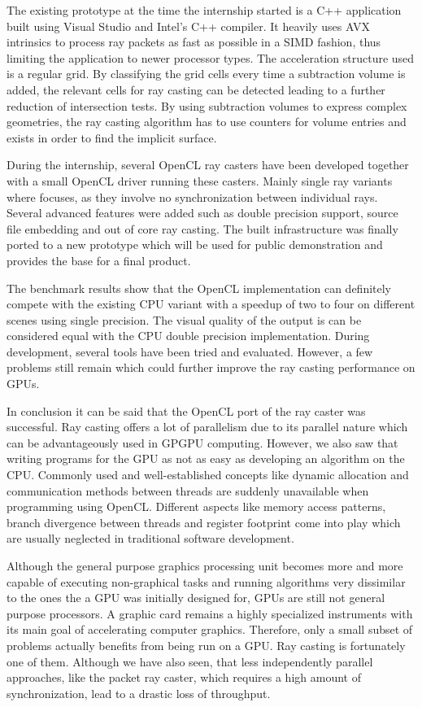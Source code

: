 The existing prototype at the time the internship started is a C++ application built using Visual Studio and Intel's C++ compiler. It heavily uses AVX intrinsics to process ray packets as fast as possible in a SIMD fashion, thus limiting the application to newer processor types. The acceleration structure used is a regular grid. By classifying the grid cells every time a subtraction volume is added, the relevant cells for ray casting can be detected leading to a further reduction of intersection tests. By using subtraction volumes to express complex geometries, the ray casting algorithm has to use counters for volume entries and exists in order to find the implicit surface.

During the internship, several OpenCL ray casters have been developed together with a small OpenCL driver running these casters. Mainly single ray variants where focuses, as they involve no synchronization between individual rays. Several advanced features were added such as double precision support, source file embedding and out of core ray casting. The built infrastructure was finally ported to a new prototype which will be used for public demonstration and provides the base for a final product.

The benchmark results show that the OpenCL implementation can definitely compete with the existing CPU variant with a speedup of two to four on different scenes using single precision. The visual quality of the output is can be considered equal with the CPU double precision implementation. During development, several tools have been tried and evaluated. However, a few problems still remain which could further improve the ray casting performance on GPUs.

In conclusion it can be said that the OpenCL port of the ray caster was successful. Ray casting offers a lot of parallelism due to its parallel nature which can be advantageously used in GPGPU computing. However, we also saw that writing programs for the GPU as not as easy as developing an algorithm on the CPU. Commonly used and well-established concepts like dynamic allocation and communication methods between threads are suddenly unavailable when programming using OpenCL. Different aspects like memory access patterns, branch divergence between threads and register footprint come into play which are usually neglected in traditional software development.

Although the general purpose graphics processing unit becomes more and more capable of executing non-graphical tasks and running algorithms very dissimilar to the ones the a GPU was initially designed for, GPUs are still not general purpose processors. A graphic card remains a highly specialized instruments with its main goal of accelerating computer graphics. Therefore, only a small subset of problems actually benefits from being run on a GPU. Ray casting is fortunately one of them. Although we have also seen, that less independently parallel approaches, like the packet ray caster, which requires a high amount of synchronization, lead to a drastic loss of throughput.


